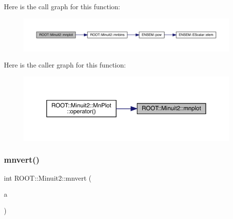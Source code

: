 Here is the call graph for this function\+:\nopagebreak
\begin{figure}[H]
\begin{center}
\leavevmode
\includegraphics[width=350pt]{d6/d3a/namespaceROOT_1_1Minuit2_a2c786d8330736525f0757ba1848f5bc4_cgraph}
\end{center}
\end{figure}
Here is the caller graph for this function\+:\nopagebreak
\begin{figure}[H]
\begin{center}
\leavevmode
\includegraphics[width=350pt]{d6/d3a/namespaceROOT_1_1Minuit2_a2c786d8330736525f0757ba1848f5bc4_icgraph}
\end{center}
\end{figure}
\mbox{\label{namespaceROOT_1_1Minuit2_a5e64c8eae56aaee62f3b683068e1148a}} 
\subsubsection{\texorpdfstring{mnvert()}{mnvert()}}
{\footnotesize\ttfamily int R\+O\+O\+T\+::\+Minuit2\+::mnvert (\begin{DoxyParamCaption}\item[{\mbox{\hyperlink{namespaceROOT_1_1Minuit2_a9e74ad97f5537a2e80e52b04d98ecc6e}{Mn\+Algebraic\+Sym\+Matrix}} \&}]{a }\end{DoxyParamCaption})}

